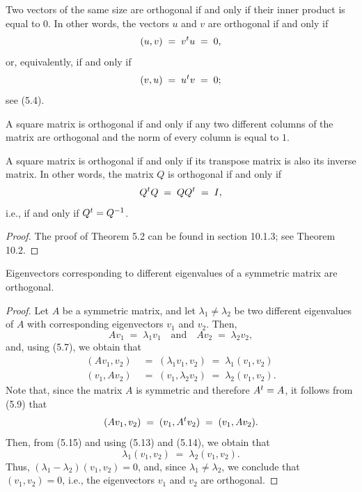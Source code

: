 
\begin{definition}
Two vectors of the same size are orthogonal if and only if their inner product is
equal to $0$. In other words, the vectors $u$ and $v$ are orthogonal if and only if
\[
(u,v) \;=\; v^{t} u \;=\; 0,
\]
or, equivalently, if and only if
\[
(v,u) \;=\; u^{t} v \;=\; 0;
\]
see (5.4).
\end{definition}

\begin{definition}
A square matrix is orthogonal if and only if any two different columns of the matrix
are orthogonal and the norm of every column is equal to $1$.
\end{definition}

\begin{theorem}
A square matrix is orthogonal if and only if its transpose matrix is also its inverse
matrix. In other words, the matrix $Q$ is orthogonal if and only if
\begin{equation}
Q^{t} Q \;=\; QQ^{t} \;=\; I,
\end{equation}
i.e., if and only if $Q^{t} = Q^{-1}$.
\end{theorem}

\begin{proof}
The proof of Theorem 5.2 can be found in section 10.1.3; see Theorem 10.2.
\end{proof}

\begin{theorem}
Eigenvectors corresponding to different eigenvalues of a symmetric matrix are
orthogonal.
\end{theorem}

\begin{proof}
Let $A$ be a symmetric matrix, and let $\lambda_1 \neq \lambda_2$ be two different
eigenvalues of $A$ with corresponding eigenvectors $v_1$ and $v_2$. Then,
\begin{equation}
Av_1 \;=\; \lambda_1v_1 \quad \text{and} \quad Av_2 \;=\; \lambda_2v_2,
\end{equation}
and, using (5.7), we obtain that
\begin{align}
(Av_1,v_2) &\;=\; (\lambda_1v_1,v_2) \;=\; \lambda_1(v_1,v_2)\\
(v_1,Av_2) &\;=\; (v_1,\lambda_2v_2) \;=\; \lambda_2(v_1,v_2).
\end{align}
Note that, since the matrix $A$ is symmetric and therefore $A^{t} = A$, it follows from
(5.9) that
\begin{equation}
(Av_1,v_2) \;=\; (v_1,A^{t} v_2) \;=\; (v_1,Av_2).
\end{equation}
Then, from (5.15) and using (5.13) and (5.14), we obtain that
\[
\lambda_1(v_1,v_2) \;=\; \lambda_2(v_1,v_2).
\]
Thus, $(\lambda_1 - \lambda_2)(v_1,v_2) = 0$, and, since $\lambda_1 \neq \lambda_2$, we
conclude that $(v_1,v_2) = 0$, i.e., the eigenvectors $v_1$ and $v_2$ are orthogonal.
\end{proof}


